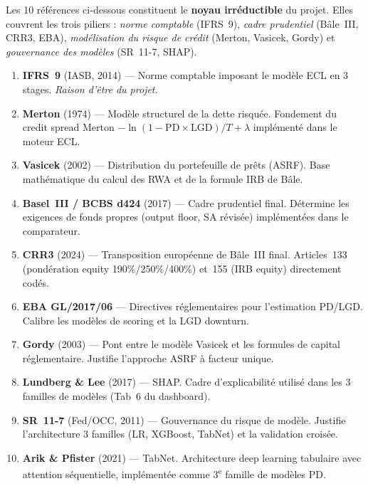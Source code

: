 \documentclass[12pt,a4paper]{article}
\begin{document}
\begin{keyref}
Les 10 références ci-dessous constituent le \textbf{noyau irréductible} du projet. Elles couvrent les trois piliers : \emph{norme comptable} (IFRS~9), \emph{cadre prudentiel} (Bâle~III, CRR3, EBA), \emph{modélisation du risque de crédit} (Merton, Vasicek, Gordy) et \emph{gouvernance des modèles} (SR~11-7, SHAP).

\begin{enumerate}[leftmargin=2em]
  \item \textbf{IFRS~9} (IASB, 2014) --- Norme comptable imposant le modèle ECL en 3 stages. \emph{Raison d'être du projet.}
  \item \textbf{Merton} (1974) --- Modèle structurel de la dette risquée. Fondement du credit spread Merton $-\ln(1-\text{PD}\times\text{LGD})/T + \lambda$ implémenté dans le moteur ECL.
  \item \textbf{Vasicek} (2002) --- Distribution du portefeuille de prêts (ASRF). Base mathématique du calcul des RWA et de la formule IRB de Bâle.
  \item \textbf{Basel~III / BCBS d424} (2017) --- Cadre prudentiel final. Détermine les exigences de fonds propres (output floor, SA révisée) implémentées dans le comparateur.
  \item \textbf{CRR3} (2024) --- Transposition européenne de Bâle~III final. Articles~133 (pondération equity 190\%/250\%/400\%) et~155 (IRB equity) directement codés.
  \item \textbf{EBA GL/2017/06} --- Directives réglementaires pour l'estimation PD/LGD. Calibre les modèles de scoring et la LGD downturn.
  \item \textbf{Gordy} (2003) --- Pont entre le modèle Vasicek et les formules de capital réglementaire. Justifie l'approche ASRF à facteur unique.
  \item \textbf{Lundberg \& Lee} (2017) --- SHAP. Cadre d'explicabilité utilisé dans les 3 familles de modèles (Tab~6 du dashboard).
  \item \textbf{SR~11-7} (Fed/OCC, 2011) --- Gouvernance du risque de modèle. Justifie l'architecture 3 familles (LR, XGBoost, TabNet) et la validation croisée.
  \item \textbf{Arik \& Pfister} (2021) --- TabNet. Architecture deep learning tabulaire avec attention séquentielle, implémentée comme 3\textsuperscript{e} famille de modèles PD.
\end{enumerate}
\end{keyref}

\vspace{12pt}
\end{document}
